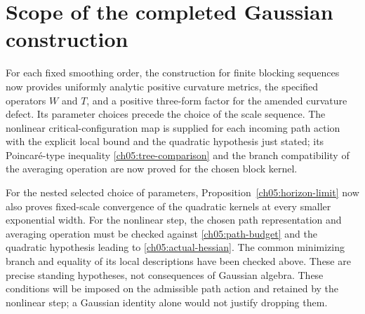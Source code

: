 \section{Scope of the completed Gaussian construction}
\label{ch05:pending}

For each fixed smoothing order, the construction for finite blocking sequences
now provides uniformly analytic positive curvature metrics,
the specified operators $W$ and $T$, and a positive
three-form factor for the amended curvature defect. Its
parameter choices precede the choice of the scale sequence.
The nonlinear critical-configuration map is supplied for each incoming
path action with the explicit local bound and the quadratic hypothesis
just stated; its Poincar\'e-type inequality \eqref{ch05:tree-comparison} and the
branch compatibility of the averaging operation are now proved for the chosen block kernel.

For the nested selected choice of parameters, Proposition~\ref{ch05:horizon-limit}
now also proves fixed-scale convergence of the quadratic kernels
at every smaller exponential width. For the nonlinear
step, the chosen path representation and averaging operation must be
checked against \eqref{ch05:path-budget} and the quadratic hypothesis leading to
\eqref{ch05:actual-hessian}. The common minimizing
branch and equality of its local descriptions have been checked above. These are precise
standing hypotheses, not consequences of Gaussian algebra.
These conditions will be imposed on the admissible path action and
retained by the nonlinear step; a Gaussian identity alone would not
justify dropping them.
